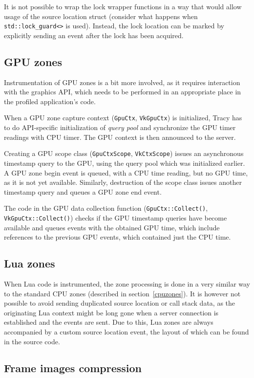 \documentclass[hidelinks,titlepage,a4paper]{article}
\begin{document}
It is not possible to wrap the lock wrapper functions in a way that would allow usage of the source location struct (consider what happens when \texttt{std::lock\_guard<>} is used). Instead, the lock location can be marked by explicitly sending an event after the lock has been acquired.

\subsection{GPU zones}

Instrumentation of GPU zones is a bit more involved, as it requires interaction with the graphics API, which needs to be performed in an appropriate place in the profiled application's code.

When a GPU zone capture context (\texttt{GpuCtx}, \texttt{VkGpuCtx}) is initialized, Tracy has to do API-specific initialization of \emph{query pool} and synchronize the GPU timer readings with CPU timer. The GPU context is then announced to the server.

Creating a GPU scope class (\texttt{GpuCtxScope}, \texttt{VkCtxScope}) issues an asynchronous timestamp query to the GPU, using the query pool which was initialized earlier. A GPU zone begin event is queued, with a CPU time reading, but no GPU time, as it is not yet available. Similarly, destruction of the scope class issues another timestamp query and queues a GPU zone end event.

The code in the GPU data collection function (\texttt{GpuCtx::Collect()}, \texttt{VkGpuCtx::Collect()}) checks if the GPU timestamp queries have become available and queues events with the obtained GPU time, which include references to the previous GPU events, which contained just the CPU time.

\subsection{Lua zones}

When Lua code is instrumented, the zone processing is done in a very similar way to the standard CPU zones (described in section~\ref{cpuzones}). It is however not possible to avoid sending duplicated source location or call stack data, as the originating Lua context might be long gone when a server connection is established and the events are sent. Due to this, Lua zones are always accompanied by a custom source location event, the layout of which can be found in the source code.

\subsection{Frame images compression}
\label{fithread}
\end{document}
